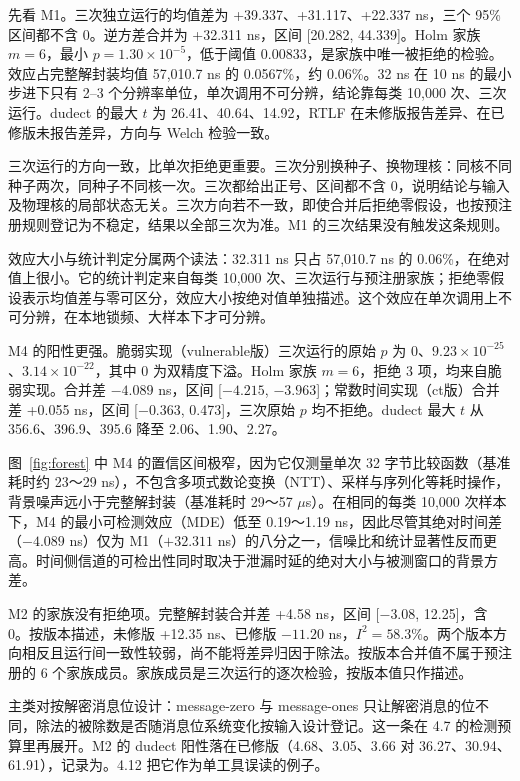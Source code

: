 先看 M1。三次独立运行的均值差为 +39.337、+31.117、+22.337 ns，三个 95\% 区间都不含 0。逆方差合并为 +32.311 ns，区间 [20.282, 44.339]。Holm 家族 $m=6$，最小 $p=1.30\times10^{-5}$，低于阈值 0.00833，是家族中唯一被拒绝的检验。效应占完整解封装均值 57,010.7 ns 的 0.0567\%，约 0.06\%。32 ns 在 10 ns 的最小步进下只有 2--3 个分辨率单位，单次调用不可分辨，结论靠每类 10,000 次、三次运行。dudect 的最大 $t$ 为 26.41、40.64、14.92，RTLF 在未修版报告差异、在已修版未报告差异，方向与 Welch 检验一致。%

三次运行的方向一致，比单次拒绝更重要。三次分别换种子、换物理核：同核不同种子两次，同种子不同核一次。三次都给出正号、区间都不含 0，说明结论与输入及物理核的局部状态无关。三次方向若不一致，即使合并后拒绝零假设，也按预注册规则登记为不稳定，结果以全部三次为准。M1 的三次结果没有触发这条规则。

效应大小与统计判定分属两个读法：32.311 ns 只占 57,010.7 ns 的 0.06\%，在绝对值上很小。它的统计判定来自每类 10,000 次、三次运行与预注册家族；拒绝零假设表示均值差与零可区分，效应大小按绝对值单独描述。这个效应在单次调用上不可分辨，在本地锁频、大样本下才可分辨。

M4 的阳性更强。脆弱实现（vulnerable版）三次运行的原始 $p$ 为 0、$9.23\times10^{-25}$、$3.14\times10^{-22}$，其中 0 为双精度下溢。Holm 家族 $m=6$，拒绝 3 项，均来自脆弱实现。合并差 $-4.089$ ns，区间 [$-4.215$, $-3.963$]；常数时间实现（ct版）合并差 +0.055 ns，区间 [$-0.363$, 0.473]，三次原始 $p$ 均不拒绝。dudect 最大 $t$ 从 356.6、396.9、395.6 降至 2.06、1.90、2.27。%

图~\ref{fig:forest} 中 M4 的置信区间极窄，因为它仅测量单次 32 字节比较函数（基准耗时约 23～29 ns），不包含多项式数论变换（NTT）、采样与序列化等耗时操作，背景噪声远小于完整解封装（基准耗时 29～57 $\mu$s）。在相同的每类 10,000 次样本下，M4 的最小可检测效应（MDE）低至 0.19～1.19 ns，因此尽管其绝对时间差（$-4.089$ ns）仅为 M1（$+32.311$ ns）的八分之一，信噪比和统计显著性反而更高。时间侧信道的可检出性同时取决于泄漏时延的绝对大小与被测窗口的背景方差。

M2 的家族没有拒绝项。完整解封装合并差 +4.58 ns，区间 [$-3.08$, 12.25]，含 0。按版本描述，未修版 +12.35 ns、已修版 $-11.20$ ns，$I^2=58.3\%$。两个版本方向相反且运行间一致性较弱，尚不能将差异归因于除法。按版本合并值不属于预注册的 6 个家族成员。家族成员是三次运行的逐次检验，按版本值只作描述。

主类对按解密消息位设计：message-zero 与 message-ones 只让解密消息的位不同，除法的被除数是否随消息位系统变化按输入设计登记。这一条在 4.7 的检测预算里再展开。M2 的 dudect 阳性落在已修版（4.68、3.05、3.66 对 36.27、30.94、61.91），记录为。4.12 把它作为单工具误读的例子。%

